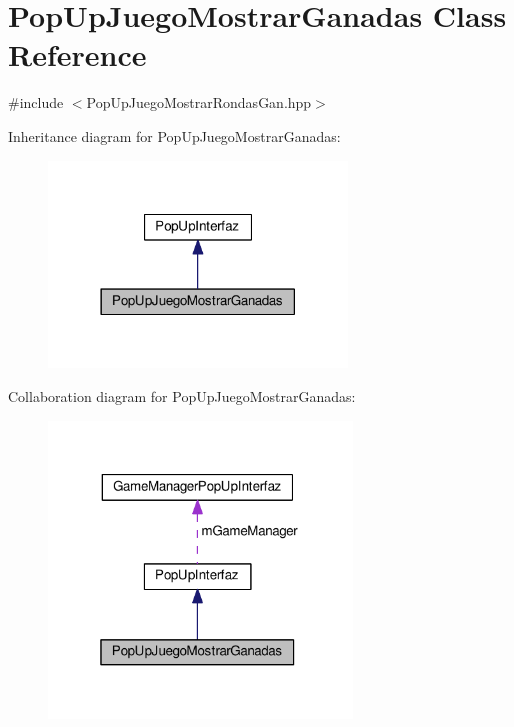 \hypertarget{class_pop_up_juego_mostrar_ganadas}{}\section{Pop\+Up\+Juego\+Mostrar\+Ganadas Class Reference}
\label{class_pop_up_juego_mostrar_ganadas}


{\ttfamily \#include $<$Pop\+Up\+Juego\+Mostrar\+Rondas\+Gan.\+hpp$>$}



Inheritance diagram for Pop\+Up\+Juego\+Mostrar\+Ganadas\+:
\nopagebreak
\begin{figure}[H]
\begin{center}
\leavevmode
\includegraphics[width=225pt]{class_pop_up_juego_mostrar_ganadas__inherit__graph}
\end{center}
\end{figure}


Collaboration diagram for Pop\+Up\+Juego\+Mostrar\+Ganadas\+:
\nopagebreak
\begin{figure}[H]
\begin{center}
\leavevmode
\includegraphics[width=229pt]{class_pop_up_juego_mostrar_ganadas__coll__graph}
\end{center}
\end{figure}
